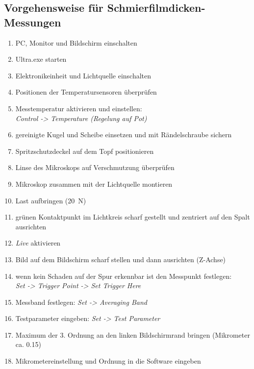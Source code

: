 \begin{appendices}
    \section{Vorgehensweise für Schmierfilmdicken-Messungen \cite{surborg_2007}}
        \begin{enumerate}
            \item PC, Monitor und Bildschirm einschalten
            \item Ultra.exe starten
            \item Elektronikeinheit und Lichtquelle einschalten
            \item Positionen der Temperatursensoren überprüfen
            \item Messtemperatur aktivieren und einstellen: \\
                \textit{Control -> Temperature (Regelung auf Pot)}
            \item gereinigte Kugel und Scheibe einsetzen und mit Rändelschraube sichern
            \item Spritzschutzdeckel auf dem Topf positionieren
            \item Linse des Mikroskops auf Verschmutzung überprüfen
            \item Mikroskop zusammen mit der Lichtquelle montieren
            \item Last aufbringen (\SI{20}{\newton})
            \item grünen Kontaktpunkt im Lichtkreis scharf gestellt und zentriert auf den Spalt ausrichten
            \item \textit{Live} aktivieren
            \item Bild auf dem Bildschirm scharf stellen und dann ausrichten (Z-Achse)
            \item wenn kein Schaden auf der Spur erkennbar ist den Messpunkt festlegen: \\
                \textit{Set -> Trigger Point -> Set Trigger Here}
            \item Messband festlegen: \textit{Set -> Averaging Band}
            \item Testparameter eingeben: \textit{Set -> Test Parameter}
            \item Maximum der 3. Ordnung an den linken Bildschirmrand bringen (Mikrometer ca. \num{0.15})
            \item Mikrometereinstellung und Ordnung in die Software eingeben

\end{enumerate}
\end{appendices}
